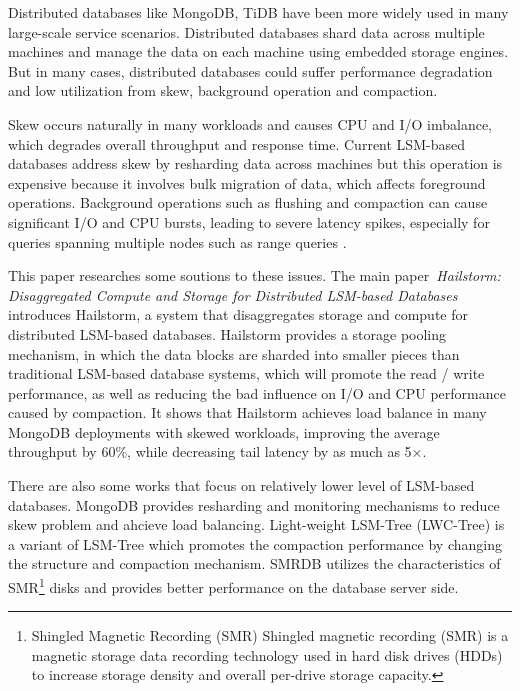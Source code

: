 \documentclass[a4paper,10pt,twoside]{article}
\begin{document}
Distributed databases like MongoDB\cite{MongoDB_sharding1}, TiDB\cite{tidb} have been more widely used in many large-scale service scenarios.
Distributed databases shard data across multiple machines and manage the data on each machine using embedded storage engines.
But in many cases, distributed databases could suffer performance degradation and low utilization from skew, background operation and compaction.
\par
Skew occurs naturally in many workloads and causes CPU and I/O imbalance, which degrades overall throughput and response time. \cite{Hua1991HandlingDS}
Current LSM-based databases address skew by resharding data\cite{MongoDB_sharding1,tidb} across machines but this operation is expensive because it involves bulk migration of data, which affects foreground operations.
Background operations such as flushing and compaction can cause significant I/O and CPU bursts, leading to severe latency spikes, especially for queries spanning multiple nodes such as range queries \cite{10.1007/978-3-319-10085-2_18, 10.14778/2757807.2757810}.
\par
This paper researches some soutions to these issues.
The main paper~\textit{Hailstorm: Disaggregated Compute and Storage for Distributed LSM-based Databases} \cite{mainpaper}introduces Hailstorm, a system that disaggregates storage and compute for distributed LSM-based databases.
Hailstorm provides a storage pooling mechanism, in which the data blocks are sharded into smaller pieces than traditional LSM-based database systems, which will promote the read / write performance, 
as well as reducing the bad influence on I/O and CPU performance caused by compaction.
It shows that Hailstorm achieves load balance in many MongoDB deployments with skewed workloads, improving the average throughput by 60$\%$, while decreasing tail latency by as much as 5×.
\par
There are also some works that focus on relatively lower level of LSM-based databases.
MongoDB provides resharding and monitoring mechanisms to reduce skew problem and ahcieve load balancing.
Light-weight LSM-Tree (LWC-Tree) is a variant of LSM-Tree which promotes the compaction performance by changing the structure and compaction mechanism.
SMRDB\cite{SMRDB} utilizes the characteristics of SMR\footnote{Shingled Magnetic Recording (SMR) Shingled magnetic recording (SMR) is a magnetic storage data recording technology used in hard disk drives (HDDs) to increase storage density and overall per-drive storage capacity.} \cite{SMRDB} disks and provides better performance on the database server side.
\end{document}
